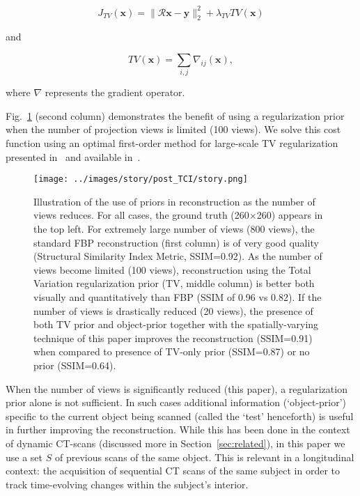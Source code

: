 \documentclass[journal]{IEEEtran}
\begin{document}
 \begin{equation}
   J_{TV}(\boldsymbol{x}) = \lVert\boldsymbol{\mathcal{R}x}- \boldsymbol{y}\rVert_2^2 + \lambda_{TV}TV(\boldsymbol{x})
   \label{Eq:simple_TV}
 \end{equation}

 and 

  \begin{equation}
   TV(\boldsymbol{x}) = \sum_{i,j}\nabla_{ij}(\boldsymbol{x}),
   \label{Eq:definition_TV}
\end{equation}

  where $\nabla$ represents the gradient operator.
  
 Fig.~\ref{fig:story} (second column) demonstrates the benefit of
 using a regularization prior when the number of projection views is
 limited (100 views).  We solve this cost function using an optimal
 first-order method for large-scale TV regularization presented
 in~\cite{TVReg} and available in~\cite{TVReg-lib}.


 \begin{figure}[t]
\centering
	\texttt{[image: ../images/story/post\_TCI/story.png]}
        \caption{Illustration of the use of priors in reconstruction
          as the number of views reduces. For all cases, the ground
          truth (260$\times$260) appears in the top left.  For
          extremely large number of views (800 views), the standard
          FBP reconstruction (first column) is of very good quality
          (Structural Similarity Index Metric, SSIM=0.92). As the
          number of views become limited (100 views), reconstruction
          using the Total Variation regularization prior (TV, middle
          column) is better both visually and quantitatively than FBP
          (SSIM of 0.96 vs 0.82). If the number of views is
          drastically reduced (20 views), the presence of both TV
          prior and object-prior together with the spatially-varying
          technique of this paper improves the reconstruction
          (SSIM=0.91) when compared to presence of TV-only prior
          (SSIM=0.87) or no prior (SSIM=0.64).}
 \label{fig:story}
 \end{figure} 

  When the number of views is significantly reduced (this paper), a
 regularization prior alone is not sufficient.  In such cases
 additional information (`object-prior') specific to the current
 object being scanned (called the `test' henceforth) is useful in
 further improving the reconstruction.  While this has been done in
 the context of dynamic CT-scans (discussed more in
 Section~\ref{sec:related}), in this paper we use a set $S$ of
 previous scans of the same object. This is relevant in a longitudinal
 context: the acquisition of sequential CT scans of the same subject
 in order to track time-evolving changes within the subject's
 interior. 
\end{document}
